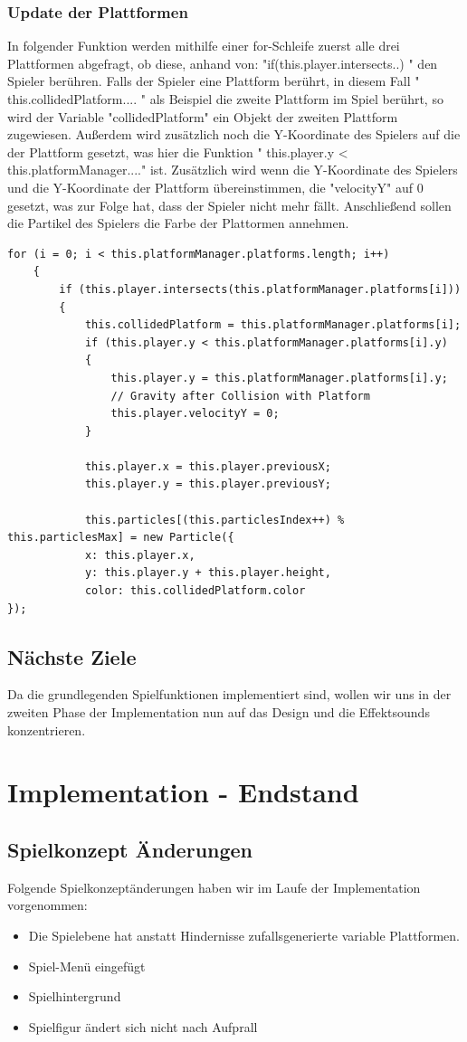 \subsubsection{Update der Plattformen}
In folgender Funktion werden mithilfe einer for-Schleife zuerst alle drei Plattformen abgefragt, ob diese, anhand von: "if(this.player.intersects..) " den Spieler ber\"uhren. Falls der Spieler eine Plattform ber\"uhrt, in diesem Fall " this.collidedPlatform.... " als Beispiel die zweite Plattform im Spiel ber\"uhrt, so wird der Variable "collidedPlatform" ein Objekt der zweiten Plattform zugewiesen. Außerdem wird zus\"atzlich noch die Y-Koordinate des Spielers auf die der Plattform gesetzt, was hier die Funktion " this.player.y < this.platformManager...." ist. Zus\"atzlich wird wenn die Y-Koordinate des Spielers und die Y-Koordinate der Plattform \"ubereinstimmen, die "velocityY" auf 0 gesetzt, was zur Folge hat, dass der Spieler nicht mehr f\"allt. Anschließend sollen die Partikel des Spielers die Farbe der Plattormen annehmen.
\lstset{language=java}
\begin{lstlisting}[frame=single]
    for (i = 0; i < this.platformManager.platforms.length; i++) 
    {
		if (this.player.intersects(this.platformManager.platforms[i])) 
		{
			this.collidedPlatform = this.platformManager.platforms[i];
			if (this.player.y < this.platformManager.platforms[i].y) 
			{
				this.player.y = this.platformManager.platforms[i].y;
				// Gravity after Collision with Platform
				this.player.velocityY = 0;
			}

			this.player.x = this.player.previousX;
			this.player.y = this.player.previousY;
			
			this.particles[(this.particlesIndex++) % this.particlesMax] = new Particle({
			x: this.player.x,
			y: this.player.y + this.player.height,
			color: this.collidedPlatform.color
});
\end{lstlisting}
\subsection{Nächste Ziele}
Da die grundlegenden Spielfunktionen implementiert sind, wollen wir uns in der zweiten Phase der Implementation nun auf das Design und die Effektsounds konzentrieren.
\section{Implementation - Endstand}
\subsection{Spielkonzept Änderungen}
Folgende Spielkonzeptänderungen haben wir im Laufe der Implementation vorgenommen:
\begin{itemize}
	\item Die Spielebene hat anstatt Hindernisse zufallsgenerierte variable Plattformen.
	\item Spiel-Menü eingefügt
	\item Spielhintergrund
	\item Spielfigur ändert sich nicht nach Aufprall
\end{itemize}
